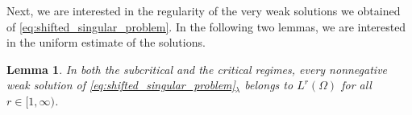 \documentclass[11pt]{article}
\newtheorem{lemma}{Lemma}[section] %
\begin{document}


Next, we are interested in the regularity of the very weak solutions we obtained of \eqref{eq:shifted_singular_problem}. In the following two lemmas, we are interested in the uniform estimate of the solutions.

\begin{lemma}\label{lem:Lr-regularity}
In both the subcritical and the critical regimes, every nonnegative weak solution of \eqref{eq:shifted_singular_problem}$_\lambda$ belongs to $L^r(\Omega)$ for all $r\in[1,\infty)$.
\end{lemma}
\end{document}
